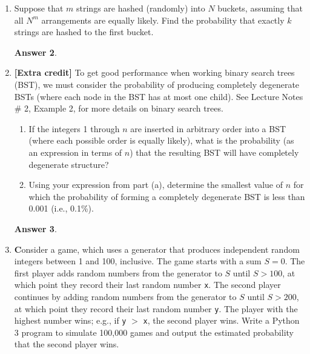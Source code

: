 \documentclass[12pt]{article}
\renewcommand{\(}{\left(}
\renewcommand{\)}{\right)}
\theoremstyle{definition}
\newtheorem*{answer}{Answer}
\begin{document}
\begin{enumerate}
\begin{shaded}
\begin{answer}
    \end{answer}
    \end{shaded}
    \newpage


\item Suppose that $m$ strings are hashed (randomly) into $N$ buckets, assuming that all $N^m$ arrangements are equally likely.  Find the probability that exactly $k$ strings are hashed to the first bucket.

    \begin{shaded}
    \begin{answer}

    \end{answer}
    \end{shaded}
    \newpage


\item \textbf{[Extra credit]} To get good performance when working binary search trees (BST), we must consider the probability of producing completely degenerate BSTs (where each node in the BST has at most one child). See Lecture Notes \# 2, Example 2, for more details on binary search trees.
    \begin{enumerate}[label=\alph*.]

    \item If the integers 1 through $n$ are inserted in arbitrary order into a BST (where each possible order is equally likely), what is the probability (as an expression in terms of $n$) that the resulting BST will have completely degenerate structure?
    \item Using your expression from part (a), determine the smallest value of $n$ for which the probability of forming a completely degenerate BST is less than 0.001 (i.e., 0.1\%).

    \end{enumerate}

    \begin{shaded}
    \begin{answer}

    \end{answer}
    \end{shaded}
    \newpage


\item \textbf Consider a game, which uses a generator that produces independent random integers between 1 and 100, inclusive. The game starts with a sum $S = 0$. The first player adds random numbers from the generator to $S$ until $S > 100$, at which point they record their last random number \texttt{x}. The second player continues by adding random numbers from the generator to $S$ until $S > 200$, at which point they record their last random number \texttt{y}. The player with the highest number wins; e.g., if \texttt{y} $>$ \texttt{x}, the second player wins. Write a Python 3 program to simulate 100,000 games and output the estimated probability that the second player wins.


\end{enumerate}
\end{document}
